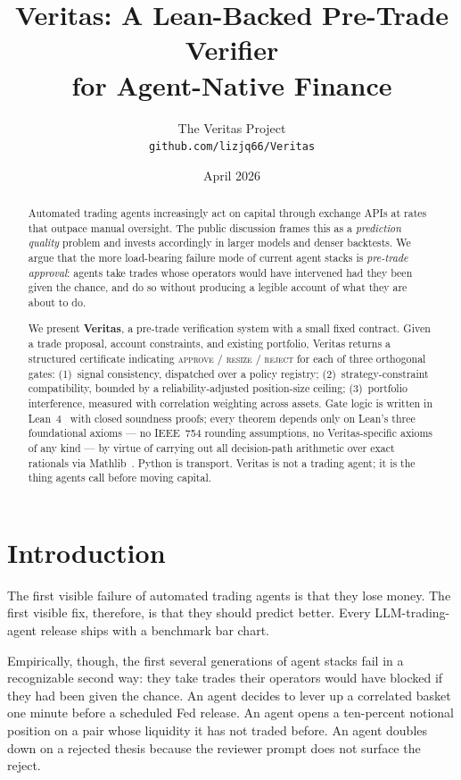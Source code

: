 \documentclass[11pt, a4paper]{article}
\title{\textbf{Veritas:} A Lean-Backed Pre-Trade Verifier \\ for Agent-Native Finance}
\author{The Veritas Project \\ \texttt{\small github.com/lizjq66/Veritas}}
\date{April 2026}
\begin{document}
\maketitle

\begin{abstract}
\noindent
Automated trading agents increasingly act on capital through exchange APIs
at rates that outpace manual oversight. The public discussion frames this as
a \emph{prediction quality} problem and invests accordingly in larger models
and denser backtests. We argue that the more load-bearing failure mode of
current agent stacks is \emph{pre-trade approval}: agents take trades whose
operators would have intervened had they been given the chance, and do so
without producing a legible account of what they are about to do.

We present \textbf{Veritas}, a pre-trade verification system with a small
fixed contract. Given a trade proposal, account constraints, and existing
portfolio, Veritas returns a structured certificate indicating
\textsc{approve} / \textsc{resize} / \textsc{reject} for each of three
orthogonal gates: (1)~signal consistency, dispatched over a policy
registry; (2)~strategy-constraint compatibility, bounded by a
reliability-adjusted position-size ceiling; (3)~portfolio interference,
measured with correlation weighting across assets. Gate logic is written
in Lean~4~\cite{lean4} with closed soundness proofs; every theorem
depends only on Lean's three foundational axioms — no IEEE~754 rounding
assumptions, no Veritas-specific axioms of any kind — by virtue of
carrying out all decision-path arithmetic over exact rationals via
Mathlib~\cite{mathlib}. Python is transport. Veritas is not a trading
agent; it is the thing agents call before moving capital.
\end{abstract}

\section{Introduction}
\label{sec:intro}

The first visible failure of automated trading agents is that they lose
money. The first visible fix, therefore, is that they should predict better.
Every LLM-trading-agent release ships with a benchmark bar chart.

Empirically, though, the first several generations of agent stacks fail in
a recognizable second way: they take trades their operators would have
blocked if they had been given the chance. An agent decides to lever up a
correlated basket one minute before a scheduled Fed release. An agent opens
a ten-percent notional position on a pair whose liquidity it has not traded
before. An agent doubles down on a rejected thesis because the reviewer
prompt does not surface the reject.
\end{document}
